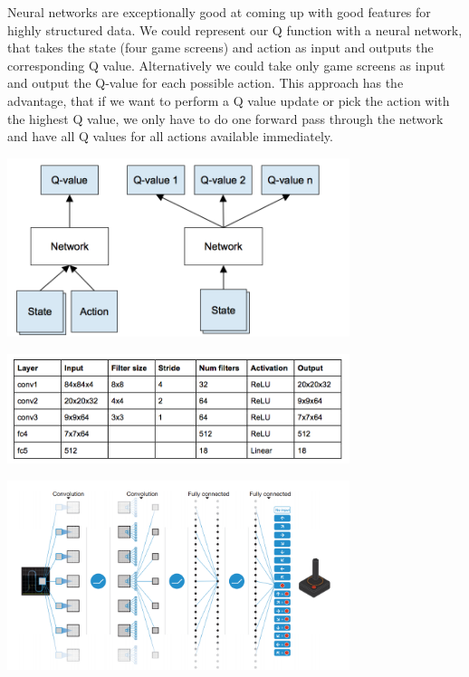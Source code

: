 \documentclass[twoside,letterpaper]{article}
\begin{document}
{{Neural networks are exceptionally good at coming up with good features for highly structured data. We could represent our Q function with a neural network, that takes the state (four game screens) and action as input and outputs the corresponding Q value. Alternatively we could take only game screens as input and output the Q-value for each possible action. This approach has the advantage, that if we want to perform a Q value update or pick the action with the highest Q value, we only have to do one forward pass through the network and have all Q values for all actions available immediately.\\
\begin{centering}
\includegraphics[width=10cm]{images/deep.png}\\
\end{centering}
\bigskip
\begin{centering}
\includegraphics[width=10cm]{images/deep2.png}\\
\end{centering}
\begin{centering}
\includegraphics[width=10cm]{images/deep4.png}\\
\end{centering}

}}
\end{document}

